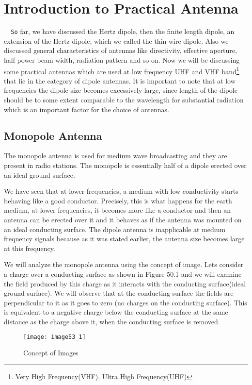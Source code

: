 \chapter{Introduction to Practical Antenna}
\verb|	So| far, we have discussed the Hertz dipole, then the finite length dipole, an extension of the Hertz dipole, which we called the thin wire dipole. Also we discussed general characteristics of antennas like directivity, effective aperture, half power beam width, radiation pattern and so on. Now we will be discussing some practical antennas which are used at low frequency UHF and VHF band\footnote{Very High Frequency(VHF), Ultra High Frequency(UHF)} that lie in the category of dipole antennas. It is important to note that at low frequencies the dipole size becomes excessively large, since length of the dipole should be to some extent comparable to the wavelength for substantial radiation which is an important factor for the choice of antennas.


\section{Monopole Antenna}The monopole antenna is used for medium wave broadcasting and they are present in radio stations. The monopole is essentially half of a dipole erected over an ideal ground surface.

We have seen that at lower frequencies, a medium with low conductivity starts behaving like a good conductor. Precisely, this is what happens for the earth medium, at lower frequencies, it becomes more like a conductor and then an antenna can be erected over it and it behaves as if the antenna was mounted on an ideal conducting surface. The dipole antenna is inapplicable at medium frequency signals because as it was stated earlier, the antenna size becomes large at this frequency.

We will analyze the monopole antenna using the concept of image. Lets consider a charge over a conducting surface as shown in Figure 50.1 and we will examine the field produced by this charge as it interacts with the conducting surface(ideal ground surface). We will observe that at the conducting surface the fields are perpendicular to it as it goes to zero (no charges on the conducting surface). This is equivalent to a negative charge below the conducting surface at the same distance as the charge above it, when the conducting surface is removed. 
\begin{figure}[h]
	\centering
	\texttt{[image: image53\_1]}
	\caption{Concept of Images}
	\label{fig:fig50.1}
\end{figure}

